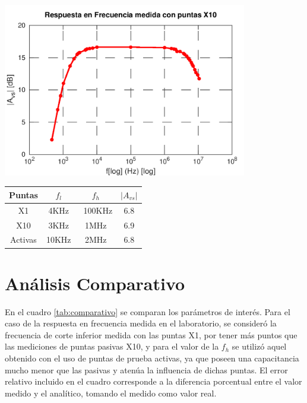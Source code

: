 \documentclass[a4paper, 10pt, spanish]{article}
\begin{document}
\begin{center}
  \includegraphics[width=0.8\textwidth]{activas.png}
  \label{fig:activas_med}
\end{center}

\begin{center}
  \begin{tabular}{|c|c|c|c|}
    \hline
    Puntas & $f_l$ & $f_h$ & $|A_{vs}|$ \\
    \hline
    X1 & 4KHz & ~100KHz & 6.8 \\
    \hline
    X10 & 3KHz & 1MHz & 6.9 \\
    \hline
    Activas & 10KHz& 2MHz & 6.8 \\
    \hline
  \end{tabular}
  \label{tab:rta_frec_med}
\end{center}

\section{Análisis Comparativo}
En el cuadro \ref{tab:comparativo} se comparan los parámetros de interés. Para el caso de la respuesta en frecuencia medida en el laboratorio, se consideró la frecuencia de corte inferior medida con las puntas X1, por tener más puntos que las mediciones de puntas pasivas X10, y para el valor de la $f_h$ se utilizó aquel obtenido con el uso de puntas de prueba activas, ya que poseen una capacitancia mucho menor que las pasivas y atenúa la influencia de dichas puntas. El error relativo incluido en el cuadro corresponde a la diferencia porcentual entre el valor medido y el analítico, tomando el medido como valor real.
\end{document}
